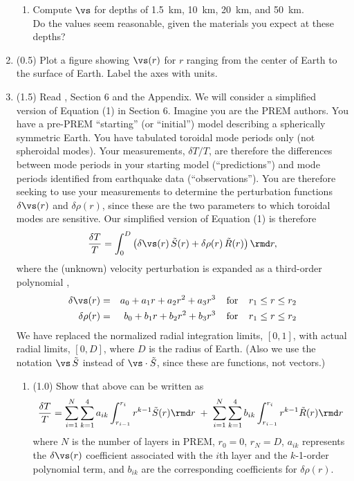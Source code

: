 \documentclass[11pt,titlepage,fleqn]{article}
\begin{document}
\begin{enumerate}
\begin{enumerate}
\item Compute $\vs$ for depths of 1.5~km, 10~km, 20~km, and 50~km. \\
Do the values seem reasonable, given the materials you expect at these depths?
\end{enumerate}


\item (0.5) Plot a figure showing $\vs(r)$ for $r$ ranging from the center of Earth to the surface of Earth. Label the axes with units.


\item (1.5) Read \citet{PREM}, Section 6 and the Appendix. We will consider a simplified version of Equation (1) in Section 6. Imagine you are the PREM authors. You have a pre-PREM ``starting'' (or ``initial'') model describing a spherically symmetric Earth. You have tabulated toroidal mode periods only (not spheroidal modes). Your measurements, $\delta T/T$, are therefore the differences between mode periods in your starting model (``predictions'') and mode periods identified from earthquake data (``observations''). You are therefore seeking to use your measurements to determine the perturbation functions $\delta\vs(r)$ and $\delta\rho(r)$, since these are the two parameters to which toroidal modes are sensitive. Our simplified version of Equation (1) is therefore
%
\begin{equation}
\frac{\delta T}{T} = \int_0^D \left(\delta\vs(r) \, \tilde{S}(r) + \delta\rho(r) \, \tilde{R}(r)\right) \rmd r,
\label{dT1}
\end{equation}
%
where the (unknown) velocity perturbation is expanded as a third-order polynomial \citep[][p.~307]{PREM},
%
\begin{eqnarray*}
\delta\vs(r) &=& a_0 + a_1 r + a_2 r^2 + a_3 r^3
\;\;\;\;{\rm for}\;\;\;\; r_1 \le r \le r_2
\\
\delta\rho(r) &=& b_0 + b_1 r + b_2 r^2 + b_3 r^3
\;\;\;\;{\rm for}\;\;\;\; r_1 \le r \le r_2
\label{dvs}
\end{eqnarray*}
%
We have replaced the normalized radial integration limits, $[0,1]$, with actual radial limits, $[0,D]$, where $D$ is the radius of Earth. (Also we use the notation $\vs\,\tilde{S}$ instead of $\vs \cdot \tilde{S}$, since these are functions, not vectors.)

\begin{enumerate}
\item (1.0) Show that  above can be written as
%
\begin{equation}
\frac{\delta T}{T} = \sum_{i=1}^N \sum_{k=1}^4 a_{ik} \int_{r_{i-1}}^{r_i} r^{k-1} \tilde{S}(r) \rmd r
\;+\; \sum_{i=1}^N \sum_{k=1}^4 b_{ik} \int_{r_{i-1}}^{r_i} r^{k-1} \tilde{R}(r) \rmd r
\label{dT2}
\end{equation}
%
where $N$ is the number of layers in PREM, $r_0 = 0$, $r_N = D$, $a_{ik}$ represents the $\delta\vs(r)$ coefficient associated with the $i$th layer and the $k$-1-order polynomial term, and $b_{ik}$ are the corresponding coefficients for $\delta\rho(r)$.


\end{enumerate}
\end{enumerate}
\end{document}
